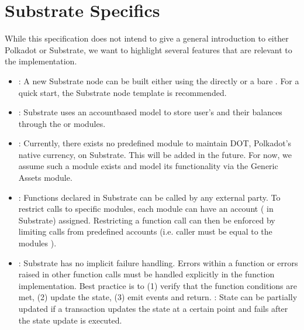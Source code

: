 \documentclass[a4paper,10pt,english]{sphinxmanual}
\begin{document}
\section{Substrate Specifics}
\label{\detokenize{intro/polkadot:substrate-specifics}}
While this specification does not intend to give a general introduction to either Polkadot or Substrate, we want to highlight several features that are relevant to the implementation.
\begin{itemize}
\item {} 
: A new Substrate node can be built either using the  directly or a bare . For a quick start, the Substrate node template is recommended.

\item {} 
: Substrate uses an account\sphinxhyphen{}based model to store user’s and their balances through the  or  modules.

\item {} 
: Currently, there exists no pre\sphinxhyphen{}defined module to maintain DOT, Polkadot’s native currency, on Substrate. This will be added in the future. For now, we assume such a module exists and model its functionality via the Generic Assets module.

\item {} 
: Functions declared in Substrate can be called by any external party. To restrict calls to specific modules, each module can have an account ( in Substrate) assigned. Restricting a function call can then be enforced by limiting calls from pre\sphinxhyphen{}defined accounts (i.e. caller  must be equal to the modules ).

\item {} 
: Substrate has no implicit failure handling. Errors within a function or errors raised in other function calls must be handled explicitly in the function implementation. Best practice is to (1) verify that the function conditions are met, (2) update the state, (3) emit events and return. : State can be partially updated if a transaction updates the state at a certain point and fails after the state update is executed.


\end{itemize}
\end{document}
